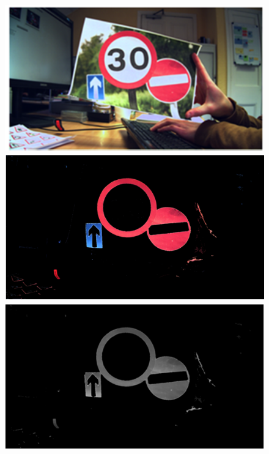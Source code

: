 \begin{figure}[H]
	\includegraphics[width=\linewidth]{images/zynq0.png}
	\caption{}\label{fig:zynq0}
	\endminipage\hfill
	\includegraphics[width=\linewidth]{images/zynq1.png}
	\caption{}\label{fig:zynq1}
	\endminipage\hfill
	\includegraphics[width=\linewidth]{images/zynq2.png}
	\caption{}\label{fig:zynq2}
	\endminipage

\end{figure}
